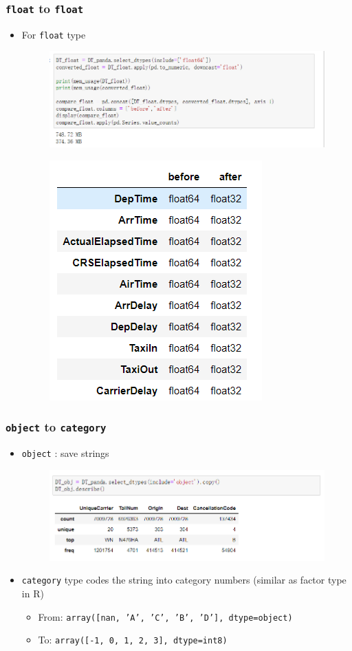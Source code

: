 \documentclass[red]{beamer}
\begin{document}
\begin{frame}
\frametitle{\texttt{float} to \texttt{float}}
\begin{itemize}
	\item For \texttt{float} type
	\begin{figure}
		\centering
		\includegraphics[width=1\linewidth]{figure/screenshot014}
	\end{figure}
	\vspace{-5mm}
	\begin{figure}
		\centering
		\includegraphics[width=0.4\linewidth]{figure/screenshot015}
	\end{figure}
\end{itemize}
\end{frame}

\begin{frame}
\frametitle{\texttt{object} to \texttt{category}}
\begin{itemize}
	\item \texttt{object} : save strings 
	\begin{figure}
		\centering
		\includegraphics[width=1\linewidth]{figure/screenshot016}
	\end{figure}
	\item \texttt{category} type codes the string into category numbers (similar as factor type in R)
		\begin{itemize}
			\item From: \texttt{array([nan, 'A', 'C', 'B', 'D'], dtype=object)}
			\item To: \texttt{array([-1,  0,  1,  2,  3], dtype=int8)}
		\end{itemize}
	
	\end{itemize}
\end{frame}
\end{document}
